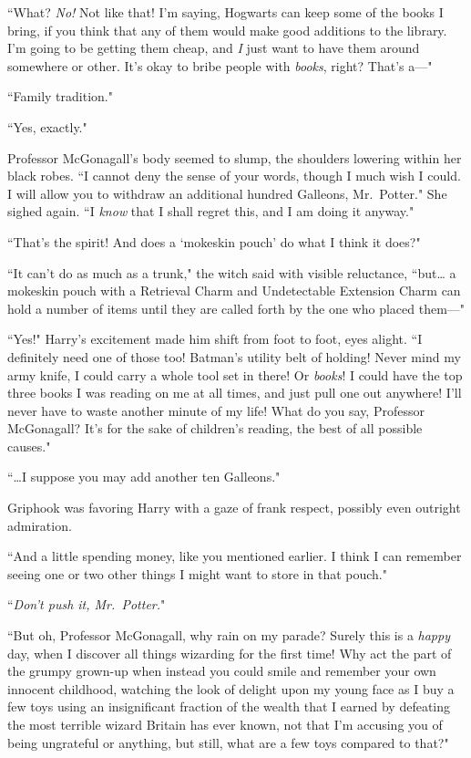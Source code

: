 ``What? \emph{No!} Not like that! I'm saying, Hogwarts can keep some of the books I bring, if you think that any of them would make good additions to the library. I'm going to be getting them cheap, and \emph{I} just want to have them around somewhere or other. It's okay to bribe people with \emph{books}, right? That's a---"

``Family tradition."

``Yes, exactly."

Professor McGonagall's body seemed to slump, the shoulders lowering within her black robes. ``I cannot deny the sense of your words, though I much wish I could. I will allow you to withdraw an additional hundred Galleons, Mr.~Potter." She sighed again. ``I \emph{know} that I shall regret this, and I am doing it anyway."

``That's the spirit! And does a `mokeskin pouch' do what I think it does?"

``It can't do as much as a trunk," the witch said with visible reluctance, ``but{\ldots} a mokeskin pouch with a Retrieval Charm and Undetectable Extension Charm can hold a number of items until they are called forth by the one who placed them---"

``Yes!" Harry's excitement made him shift from foot to foot, eyes alight. ``I definitely need one of those too! Batman's utility belt of holding! Never mind my army knife, I could carry a whole tool set in there! Or \emph{books}! I could have the top three books I was reading on me at all times, and just pull one out anywhere! I'll never have to waste another minute of my life! What do you say, Professor McGonagall? It's for the sake of children's reading, the best of all possible causes."

``{\ldots}I suppose you may add another ten Galleons."

Griphook was favoring Harry with a gaze of frank respect, possibly even outright admiration.

``And a little spending money, like you mentioned earlier. I think I can remember seeing one or two other things I might want to store in that pouch."

``\emph{Don't push it, Mr.~Potter.}"

``But oh, Professor McGonagall, why rain on my parade? Surely this is a \emph{happy} day, when I discover all things wizarding for the first time! Why act the part of the grumpy grown-up when instead you could smile and remember your own innocent childhood, watching the look of delight upon my young face as I buy a few toys using an insignificant fraction of the wealth that I earned by defeating the most terrible wizard Britain has ever known, not that I'm accusing you of being ungrateful or anything, but still, what are a few toys compared to that?"

